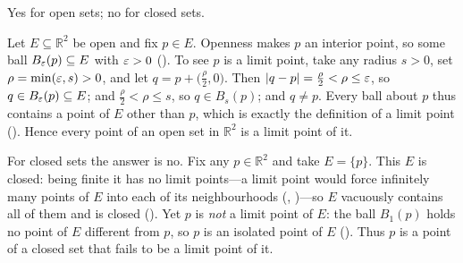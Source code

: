 \documentclass[main.tex]{subfiles}
\begin{document}
\begin{Solution}
Yes for open sets; no for closed sets.

Let $E\subseteq\mathbb R^{2}$ be open and fix $p\in E$. Openness makes $p$ an interior point, so some
ball $B_{\varepsilon}(p)\subseteq E$ with $\varepsilon>0$ (). To see $p$ is a limit point, take any radius
$s>0$, set $\rho=\min(\varepsilon,s)>0$, and let $q=p+\bigl(\tfrac{\rho}{2},0\bigr)$. Then
$|q-p|=\tfrac{\rho}{2}<\rho\le\varepsilon$, so $q\in B_{\varepsilon}(p)\subseteq E$; and $\tfrac{\rho}{2}<\rho\le s$, so
$q\in B_{s}(p)$; and $q\neq p$. Every ball about $p$ thus contains a point of $E$ other than $p$, which
is exactly the definition of a limit point (). Hence every point of an open set in
$\mathbb R^{2}$ is a limit point of it.

For closed sets the answer is no. Fix any $p\in\mathbb R^{2}$ and take $E=\{p\}$. This $E$ is closed:
being finite it has no limit points---a limit point would force infinitely many points of $E$ into
each of its neighbourhoods (, )---so $E$ vacuously contains all of them and is closed (). Yet
$p$ is \emph{not} a limit point of $E$: the ball $B_{1}(p)$ holds no point of $E$ different from $p$,
so $p$ is an isolated point of $E$ (). Thus $p$ is a point of a closed set that fails to
be a limit point of it.
\end{Solution}
\end{document}
